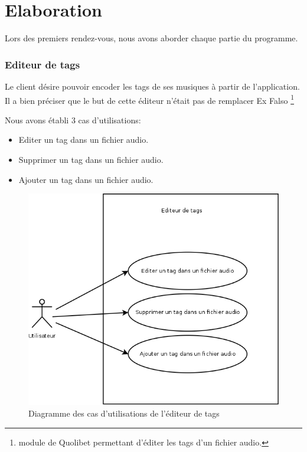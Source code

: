 \documentclass[a4paper,12pt]{report}
\begin{document}

\section{Elaboration}

Lors des premiers rendez-vous, nous avons aborder chaque partie du programme.

\subsubsection{Editeur de tags}

Le client désire pouvoir encoder les tags de ses musiques à partir de l'application. Il a bien préciser que le but de cette éditeur n'était pas de remplacer Ex Falso \footnote{module de Quolibet permettant d'éditer les tags d'un fichier audio.}

Nous avons établi 3 cas d'utilisations: 
\begin{itemize}
	\item Editer un tag dans un fichier audio.
	\item Supprimer un tag dans un fichier audio.
	\item Ajouter un tag dans un fichier audio.
\end{itemize}

\begin{figure}[!ht]
	 \caption{\label{use case 1} Diagramme des cas d'utilisations de l'éditeur de tags}
   \includegraphics[scale=0.5]{uml/UseCaseTagEditor.png}
\end{figure}
\end{document}
